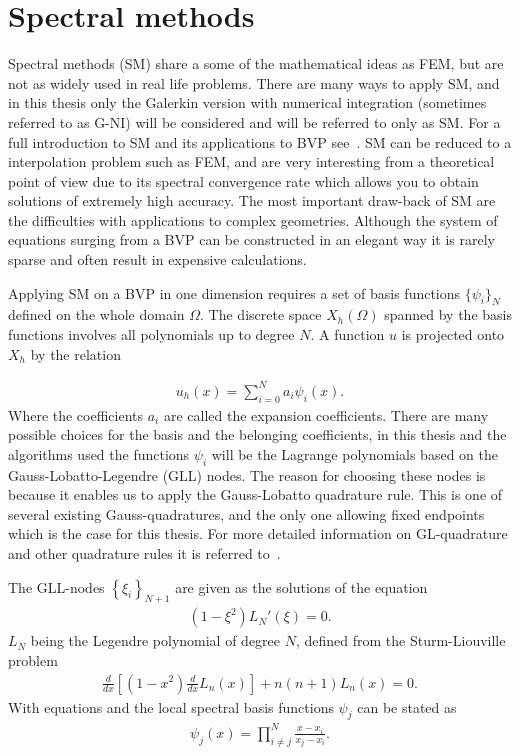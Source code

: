 
\section{Spectral methods}
Spectral methods (SM) share a some of the mathematical ideas as FEM, but are not as widely used in real life problems. 
There are many ways to apply SM, 
and in this thesis only the Galerkin version with numerical integration (sometimes referred to as G-NI) will be considered and will be referred to only as SM. 
For a full introduction to SM and its applications to BVP see~\cite{Canuto}.
SM can be reduced to a interpolation problem such as FEM, and are very interesting from a theoretical point of view due to its 
spectral convergence rate which allows you to obtain solutions of extremely high accuracy. 
The most important draw-back of SM are the difficulties with applications to complex geometries. Although the system of equations surging from
a BVP can be constructed in an elegant way it is rarely sparse and often result in expensive calculations. 

Applying SM on a BVP in one dimension requires a set of basis functions $\{\psi_i\}_N$ defined on the whole domain $\Omega$. 
The discrete space $X_h(\Omega)$ spanned by the basis functions involves all polynomials up to degree $N$.
A function $u$ is projected onto $X_h$ by the relation

\begin{align}
    u_h(x) = \sum_{i=0}^N a_i\psi_i(x).
    \label{eq:spectralprojection}
\end{align}
Where the coefficients $a_i$ are called the expansion coefficients. There are many possible choices for the basis and the belonging coefficients, 
in this thesis and the algorithms used the functions $\psi_i$ will be the Lagrange polynomials based on the Gauss-Lobatto-Legendre (GLL) nodes. 
The reason for choosing these nodes is because it enables us to apply the Gauss-Lobatto quadrature 
rule. This is one of several existing Gauss-quadratures, and the only one allowing fixed 
endpoints which is the case for this thesis. For more detailed information on GL-quadrature and 
other quadrature rules it is referred to~\cite{SM}.

The GLL-nodes $\left\{ \xi_i \right\}_{N+1}$ are given as the solutions of the equation 
\begin{align}
    (1-\xi^2)L_N'(\xi) = 0.
    \label{eq:GLL-nodes}
\end{align}
$L_N$ being the Legendre polynomial of degree $N$, defined from the Sturm-Liouville problem
\begin{align}
    \frac{d}{dx}\left[  (1-x^2)\frac{d}{dx}L_n(x)\right]+n(n+1)L_n(x) = 0.
    \label{eq:Legendre}
\end{align}
With equations  and  the local spectral 
basis functions $\psi_j$ can be stated as 
\begin{align}
    \psi_j(x) = \prod_{i\neq j}^{N}\frac{x-x_i}{x_j-x_i}.
    \label{eq:Lagrange}
\end{align}

